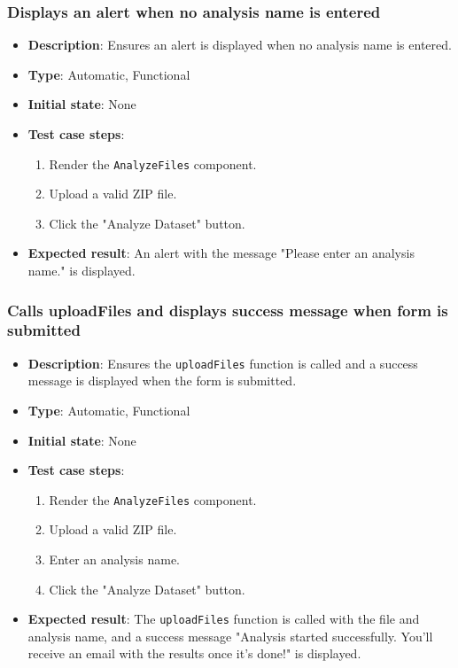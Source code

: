\documentclass[12pt, titlepage]{article}
\begin{document}
\subsubsection{Displays an alert when no analysis name is entered}
\begin{itemize}
    \item \textbf{Description}: Ensures an alert is displayed when no analysis name is entered.
    \item \textbf{Type}: Automatic, Functional
    \item \textbf{Initial state}: None
    \item \textbf{Test case steps}:
    \begin{enumerate}
        \item Render the \texttt{AnalyzeFiles} component.
        \item Upload a valid ZIP file.
        \item Click the "Analyze Dataset" button.
    \end{enumerate}
    \item \textbf{Expected result}: An alert with the message "Please enter an analysis name." is displayed.
    
\end{itemize}

\subsubsection{Calls uploadFiles and displays success message when form is submitted}
\begin{itemize}
    \item \textbf{Description}: Ensures the \texttt{uploadFiles} function is called and a success message is displayed when the form is submitted.
    \item \textbf{Type}: Automatic, Functional
    \item \textbf{Initial state}: None
    \item \textbf{Test case steps}:
    \begin{enumerate}
        \item Render the \texttt{AnalyzeFiles} component.
        \item Upload a valid ZIP file.
        \item Enter an analysis name.
        \item Click the "Analyze Dataset" button.
    \end{enumerate}
    \item \textbf{Expected result}: The \texttt{uploadFiles} function is called with the file and analysis name, and a success message "Analysis started successfully. You'll receive an email with the results once it's done!" is displayed.
\end{itemize}
\end{document}
